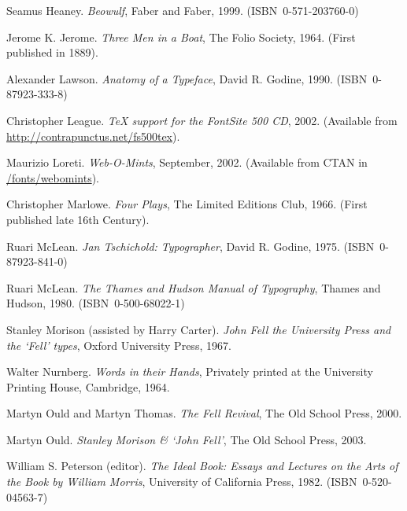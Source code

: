 \documentclass{memoir}
\newcommand*{\isbn}{{\small\textsc{ISBN}}}
\begin{document}
\begin{thebibliography}{RCHM99}
  Seamus Heaney.
  \newblock \emph{Beowulf},
  \newblock Faber and Faber, 1999. (\isbn\ 0-571-203760-0)

  Jerome K. Jerome.
  \newblock \emph{Three Men in a Boat},
  \newblock The Folio Society, 1964.
  \newblock (First published in 1889).

  Alexander Lawson.
  \newblock \emph{Anatomy of a Typeface},
  \newblock David R. Godine, 1990. (\isbn\ 0-87923-333-8)

  Christopher League.
  \newblock \emph{\TeX{} support for the FontSite 500 CD}, 2002.
  \newblock (Available from \url{http://contrapunctus.net/fs500tex}).


  Maurizio Loreti.
  \newblock \emph{Web-O-Mints}, September, 2002.
  \newblock (Available from CTAN in \url{/fonts/webomints}).

  Christopher Marlowe.
  \newblock \emph{Four Plays},
  \newblock The Limited Editions Club, 1966.
  \newblock (First published late 16th Century).

  Ruari McLean.
  \newblock \emph{Jan Tschichold: Typographer},
  \newblock David R. Godine, 1975. (\isbn\ 0-87923-841-0)

  Ruari McLean.
  \newblock \emph{The Thames and Hudson Manual of Typography},
  \newblock Thames and Hudson, 1980. (\isbn\ 0-500-68022-1)

  Stanley Morison (assisted by Harry Carter).
  \newblock \emph{John Fell the University Press and the `Fell' types},
  \newblock Oxford University Press, 1967.

  Walter Nurnberg.
  \newblock \emph{Words in their Hands},
  \newblock Privately printed at the University Printing House, Cambridge, 1964.

  Martyn Ould and Martyn Thomas.
  \newblock \emph{The Fell Revival},
  \newblock The Old School Press, 2000.

  Martyn Ould.
  \newblock \emph{Stanley Morison \& `John Fell'},
  \newblock The Old School Press, 2003.

  William S. Peterson (editor).
  \newblock \emph{The Ideal Book: Essays and Lectures on the Arts of the Book
    by William Morris},
  \newblock University of California Press, 1982. (\isbn\ 0-520-04563-7)


\end{thebibliography}
\end{document}
